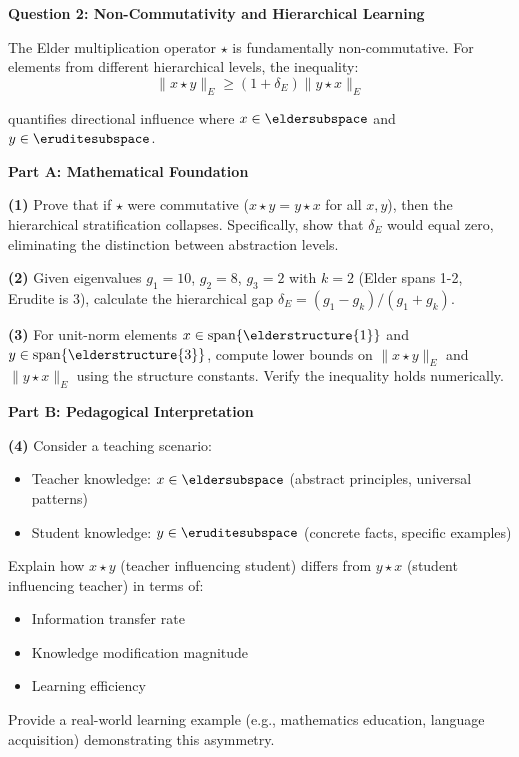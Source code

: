 \begin{critical}
\textbf{Question 2: Non-Commutativity and Hierarchical Learning}

The Elder multiplication operator $\star$ is fundamentally non-commutative. For elements from different hierarchical levels, the inequality:
$$\|x \star y\|_E \geq (1 + \delta_E) \|y \star x\|_E$$

quantifies directional influence where $x \in \eldersubspace$ and $y \in \eruditesubspace$.

\textbf{Part A: Mathematical Foundation}

\textbf{(1)} Prove that if $\star$ were commutative ($x \star y = y \star x$ for all $x,y$), then the hierarchical stratification collapses. Specifically, show that $\delta_E$ would equal zero, eliminating the distinction between abstraction levels.

\textbf{(2)} Given eigenvalues $g_1 = 10$, $g_2 = 8$, $g_3 = 2$ with $k=2$ (Elder spans 1-2, Erudite is 3), calculate the hierarchical gap $\delta_E = (g_1 - g_k)/(g_1 + g_k)$.

\textbf{(3)} For unit-norm elements $x \in \mathrm{span}\{\elderstructure{1}\}$ and $y \in \mathrm{span}\{\elderstructure{3}\}$, compute lower bounds on $\|x \star y\|_E$ and $\|y \star x\|_E$ using the structure constants. Verify the inequality holds numerically.

\textbf{Part B: Pedagogical Interpretation}

\textbf{(4)} Consider a teaching scenario:
\begin{itemize}
\item Teacher knowledge: $x \in \eldersubspace$ (abstract principles, universal patterns)
\item Student knowledge: $y \in \eruditesubspace$ (concrete facts, specific examples)
\end{itemize}

Explain how $x \star y$ (teacher influencing student) differs from $y \star x$ (student influencing teacher) in terms of:
\begin{itemize}
\item Information transfer rate
\item Knowledge modification magnitude
\item Learning efficiency
\end{itemize}

Provide a real-world learning example (e.g., mathematics education, language acquisition) demonstrating this asymmetry.


\end{critical}

